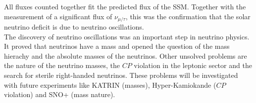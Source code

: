 All fluxes counted together fit the predicted flux of the SSM. Together with the measurement of a significant flux of $\nu_{\mu/\tau}$, this was the confirmation that the solar neutrino deficit is due to neutrino oscillations.\\
The discovery of neutrino oscillations was an important step in neutrino physics. It proved that neutrinos have a mass and opened the question of the mass hierachy and the absolute masses of the neutrinos. Other unsolved problems are the nature of the neutrino masses, the $CP$ violation in the leptonic sector and the search for sterile right-handed neutrinos. These problems will be investigated with future experiments like KATRIN (masses), Hyper-Kamiokande ($CP$ violation) and SNO+ (mass nature).
